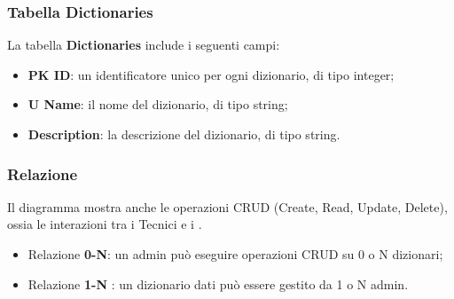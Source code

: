 \subsubsection{Tabella Dictionaries}
\par La tabella \textbf{Dictionaries} include i seguenti campi:
\begin{itemize}
    \item \textbf{PK ID}: un identificatore unico per ogni dizionario, di tipo integer;
    \item \textbf{U Name}: il nome del dizionario, di tipo string;
    \item \textbf{Description}: la descrizione del dizionario, di tipo string.
\end{itemize}

\subsubsection{Relazione}
Il diagramma mostra anche le operazioni CRUD (Create, Read, Update, Delete), ossia le interazioni tra i Tecnici e i .

\begin{itemize}
      \item Relazione \textbf{0-N}: un admin può eseguire operazioni CRUD su 0 o N dizionari;
    \item Relazione \textbf{1-N} : un dizionario dati può essere gestito da 1 o N admin.
\end{itemize}